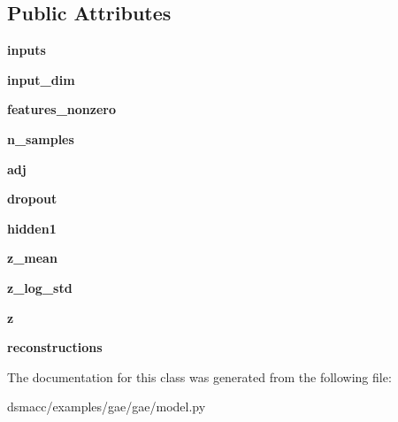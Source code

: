 \subsection*{Public Attributes}
\begin{DoxyCompactItemize}
\item 
\mbox{\label{classgae_1_1model_1_1GCNModelVAE_afd4db52cc40a26b25178b42b951c1c54}} 
{\bfseries inputs}
\item 
\mbox{\label{classgae_1_1model_1_1GCNModelVAE_af80ada8c99f516d7520a3da4757665dd}} 
{\bfseries input\+\_\+dim}
\item 
\mbox{\label{classgae_1_1model_1_1GCNModelVAE_a28955caa871d467ca1fb0f058539d00c}} 
{\bfseries features\+\_\+nonzero}
\item 
\mbox{\label{classgae_1_1model_1_1GCNModelVAE_aa0ba3cb1be7fffa1793913733f779d29}} 
{\bfseries n\+\_\+samples}
\item 
\mbox{\label{classgae_1_1model_1_1GCNModelVAE_a055cfa348d19a377219ccd15205820eb}} 
{\bfseries adj}
\item 
\mbox{\label{classgae_1_1model_1_1GCNModelVAE_ae94951e681ebdb8e1c258040613b9ad8}} 
{\bfseries dropout}
\item 
\mbox{\label{classgae_1_1model_1_1GCNModelVAE_a747f37ae4cc92193cbf6b3035ac54c03}} 
{\bfseries hidden1}
\item 
\mbox{\label{classgae_1_1model_1_1GCNModelVAE_aa051b0dad5e1fa6b5705f3aee852bd7d}} 
{\bfseries z\+\_\+mean}
\item 
\mbox{\label{classgae_1_1model_1_1GCNModelVAE_a573679d34f188e0e80e77202fae424c3}} 
{\bfseries z\+\_\+log\+\_\+std}
\item 
\mbox{\label{classgae_1_1model_1_1GCNModelVAE_a25e52992eee257b4cad6a3aa4c3bc168}} 
{\bfseries z}
\item 
\mbox{\label{classgae_1_1model_1_1GCNModelVAE_a40a9f31049a3458b5fef8f6936cb1195}} 
{\bfseries reconstructions}
\end{DoxyCompactItemize}


The documentation for this class was generated from the following file\+:\begin{DoxyCompactItemize}
\item 
dsmacc/examples/gae/gae/model.\+py\end{DoxyCompactItemize}
